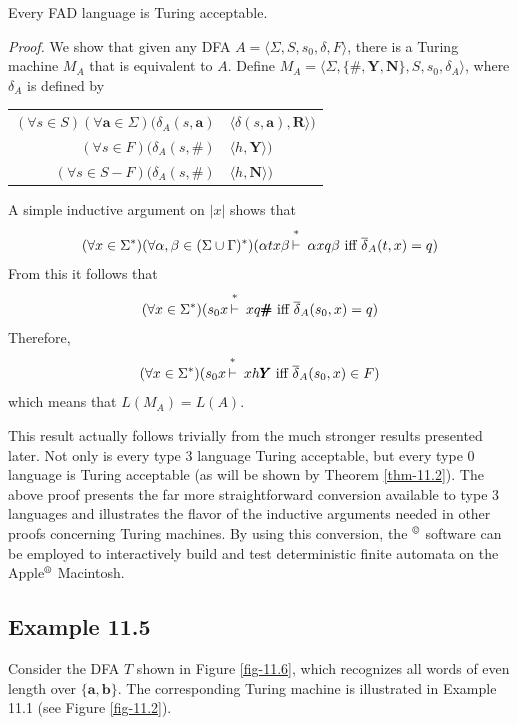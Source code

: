 \begin{thm}\label{thm-11.1}
Every FAD language is Turing acceptable.

\emph{Proof.} We show that given any DFA $A=\langle\Sigma,S,s_0,\delta,F
\rangle$, there is a Turing machine $M_A$ that is equivalent to $A$. Define
$M_A=\langle\Sigma,\{\pmb{\#},\pmb{Y},\pmb{N}\},S,s_0,\delta_A\rangle$, where
$\delta_A$ is defined by
\begin{center}\begin{tabular}{r@{ = }l}
$(\forall s\in S)(\forall\pmb{a}\in\Sigma)(\delta_A(s,\pmb{a})$ & $\langle
	\delta(s,\pmb{a}),\pmb{R}\rangle)$ \\
$(\forall s\in F)(\delta_A(s,\pmb{\#})$ & $\langle h,\pmb{Y}\rangle)$ \\
$(\forall s\in S-F)(\delta_A(s,\pmb{\#})$ & $\langle h,\pmb{N}\rangle)$
\end{tabular}\end{center}
A simple inductive argument on $|x|$ shows that
\[ (\forall x\in\Sigma^*)(\forall\alpha,\beta\in(\Sigma\cup\Gamma)^*)(\alpha tx 
	\beta\Dvdash \alpha xq\beta\text{ iff }\DBAR_A(t,x) = q) \]
From this it follows that
\[ (\forall x\in\Sigma^*)(s_0x\Dvdash xq\pmb{\#}\text{ iff }\DBAR_A(s_0,x)=q) \]
Therefore,
\[ (\forall x\in\Sigma^*)(s_0x\Dvdash xh\pmb{Y}\text{ iff }\DBAR_A(s_0,x)\in
	F) \]
which means that $L(M_A)=L(A)$.
\end{thm}

This result actually follows trivially from the much stronger results presented
later. Not only is every type 3 language Turing acceptable, but every type 0
language is Turing acceptable (as will be shown by Theorem \ref{thm-11.2}). The above
proof presents the far more straightforward conversion available to type 3
languages and illustrates the flavor of the inductive arguments needed in other
proofs concerning Turing machines. By using this conversion, the  $^{\copyright}$
software can be employed to interactively build and test deterministic finite
automata on the Apple$^{\text{\textregistered}}$ Macintosh.

\subsection*{Example 11.5}

Consider the DFA $T$ shown in Figure \ref{fig-11.6}, which recognizes all words of even
length over $\{\pmb{a},\pmb{b}\}$. The corresponding Turing machine is
illustrated in Example 11.1 (see Figure \ref{fig-11.2}).

